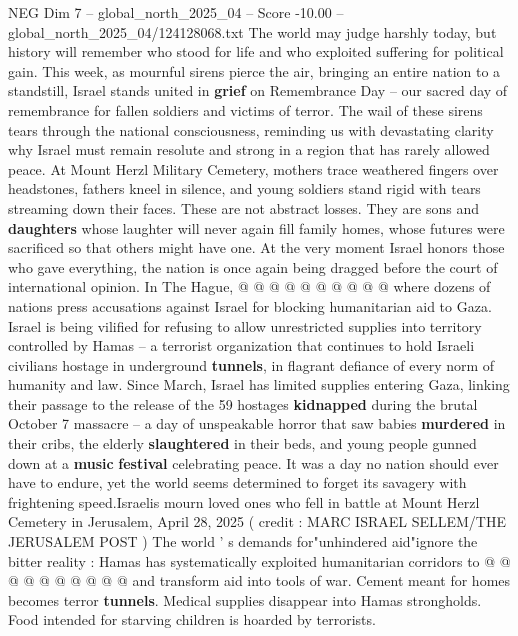 \begin{textsample}{NEG Dim 7 – global\_north\_2025\_04 – Score -10.00 – global\_north\_2025\_04/124128068.txt}  \label{ex:f7_neg_091}
The world may judge harshly today, but history will remember who stood for life and who exploited suffering for political gain.
This week, as mournful sirens pierce the air, bringing an entire nation to a standstill, Israel stands united in \textbf{grief} on Remembrance Day -- our sacred day of remembrance for fallen soldiers and victims of terror.
The wail of these sirens tears through the national consciousness, reminding us with devastating clarity why Israel must remain resolute and strong in a region that has rarely allowed peace.
At Mount Herzl Military Cemetery, mothers trace weathered fingers over headstones, fathers kneel in silence, and young soldiers stand rigid with tears streaming down their faces.
These are not abstract losses.
They are sons and \textbf{daughters} whose laughter will never again fill family homes, whose futures were sacrificed so that others might have one.
At the very moment Israel honors those who gave everything, the nation is once again being dragged before the court of international opinion.
In The Hague, @ @ @ @ @ @ @ @ @ @ where dozens of nations press accusations against Israel for blocking humanitarian aid to Gaza.
Israel is being vilified for refusing to allow unrestricted supplies into territory controlled by Hamas -- a terrorist organization that continues to hold Israeli civilians hostage in underground \textbf{tunnels}, in flagrant defiance of every norm of humanity and law.
Since March, Israel has limited supplies entering Gaza, linking their passage to the release of the 59 hostages \textbf{kidnapped} during the brutal October 7 massacre -- a day of unspeakable horror that saw babies \textbf{murdered} in their cribs, the elderly \textbf{slaughtered} in their beds, and young people gunned down at a \textbf{music} \textbf{festival} celebrating peace.
It was a day no nation should ever have to endure, yet the world seems determined to forget its savagery with frightening speed.Israelis mourn loved ones who fell in battle at Mount Herzl Cemetery in Jerusalem, April 28, 2025 ( credit : MARC ISRAEL SELLEM/THE JERUSALEM POST ) The world ' s demands for"unhindered aid"ignore the bitter reality : Hamas has systematically exploited humanitarian corridors to @ @ @ @ @ @ @ @ @ @ and transform aid into tools of war.
Cement meant for homes becomes terror \textbf{tunnels}.
Medical supplies disappear into Hamas strongholds.
Food intended for starving children is hoarded by terrorists.

\end{textsample}
